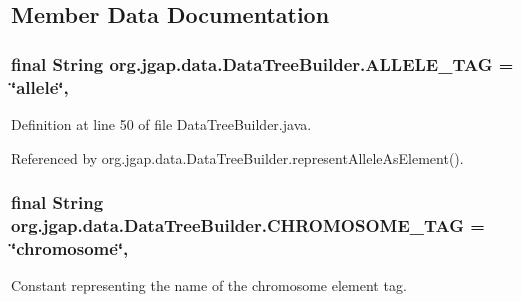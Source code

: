\subsection{Member Data Documentation}
\hypertarget{classorg_1_1jgap_1_1data_1_1_data_tree_builder_a7148bfc7e73492da0cd1d5c1cbcc0fd2}{
\subsubsection[{A\-L\-L\-E\-L\-E\-\_\-\-T\-A\-G}]{\setlength{\rightskip}{0pt plus 5cm}final String org.\-jgap.\-data.\-Data\-Tree\-Builder.\-A\-L\-L\-E\-L\-E\-\_\-\-T\-A\-G = \char`\"{}allele\char`\"{}\hspace{0.3cm}{\ttfamily [static]}, {\ttfamily [private]}}}\label{classorg_1_1jgap_1_1data_1_1_data_tree_builder_a7148bfc7e73492da0cd1d5c1cbcc0fd2}


Definition at line 50 of file Data\-Tree\-Builder.\-java.



Referenced by org.\-jgap.\-data.\-Data\-Tree\-Builder.\-represent\-Allele\-As\-Element().

\hypertarget{classorg_1_1jgap_1_1data_1_1_data_tree_builder_a16cc969003639f011808aa7c7d390986}{
\subsubsection[{C\-H\-R\-O\-M\-O\-S\-O\-M\-E\-\_\-\-T\-A\-G}]{\setlength{\rightskip}{0pt plus 5cm}final String org.\-jgap.\-data.\-Data\-Tree\-Builder.\-C\-H\-R\-O\-M\-O\-S\-O\-M\-E\-\_\-\-T\-A\-G = \char`\"{}chromosome\char`\"{}\hspace{0.3cm}{\ttfamily [static]}, {\ttfamily [private]}}}\label{classorg_1_1jgap_1_1data_1_1_data_tree_builder_a16cc969003639f011808aa7c7d390986}
Constant representing the name of the chromosome element tag. 

